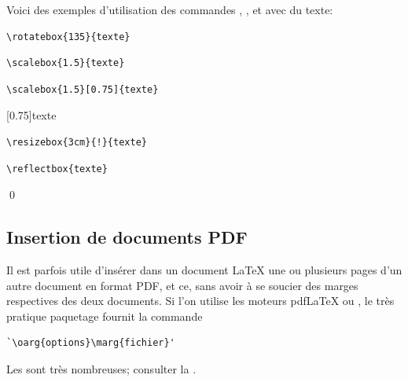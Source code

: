 \begin{exemple}
  Voici des exemples d'utilisation des commandes \cmd{\rotatebox},
  \cmd{\scalebox}, \cmd{\resizebox} et  avec du texte:
  \begin{demo}
    \begin{texample}[0.55\linewidth]
\begin{lstlisting}
\rotatebox{135}{texte}
\end{lstlisting}
      \producing
    \end{texample}

    \begin{texample}[0.55\linewidth]
\begin{lstlisting}
\scalebox{1.5}{texte}
\end{lstlisting}
      \producing
    \end{texample}

    \begin{texample}[0.55\linewidth]
\begin{lstlisting}
\scalebox{1.5}[0.75]{texte}
\end{lstlisting}
      \producing
      \scalebox{1.5}[0.75]{texte}
    \end{texample}

    \begin{texample}[0.55\linewidth]
\begin{lstlisting}
\resizebox{3cm}{!}{texte}
\end{lstlisting}
      \producing
    \end{texample}

    \begin{texample}[0.55\linewidth]
\begin{lstlisting}
\reflectbox{texte}
\end{lstlisting}
      \producing
    \end{texample}
  \end{demo}
  \qed
\end{exemple}



\subsection{Insertion de documents PDF}
\label{sec:tableaux:figures:pdfpages}

Il est parfois utile d'insérer dans un document {\LaTeX} une ou
plusieurs pages d'un autre document en format PDF, et ce, sans avoir à
se soucier des marges respectives des deux documents. Si l'on utilise
les moteurs pdf{\LaTeX} ou {\XeLaTeX}, le très pratique paquetage
 \citep{pdfpages} fournit la commande
\begin{lstlisting}
`\oarg{options}\marg{fichier}'
\end{lstlisting}
Les  sont très nombreuses; consulter la %
.

